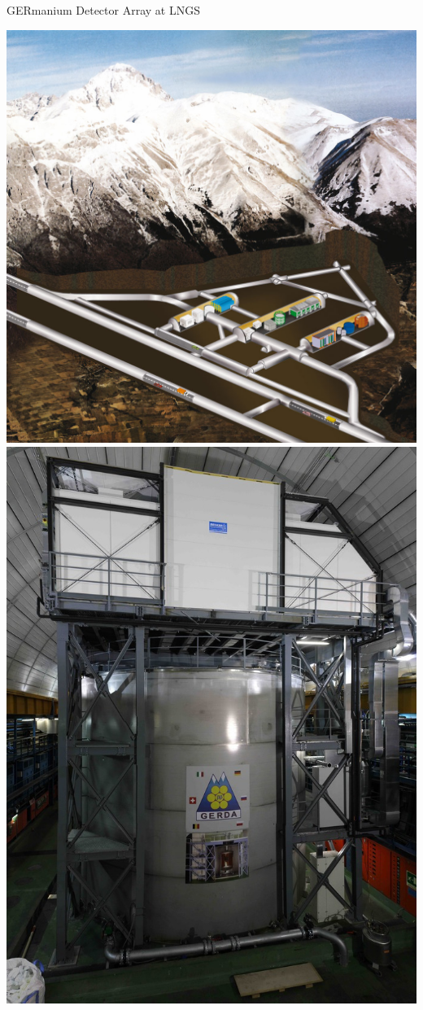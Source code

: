\documentclass[10pt,aspectratio=169]{beamer}
\begin{document}
\begin{frame}[plain]{\alert{GER}manium \alert{D}etector \alert{A}rray at LNGS}
  \begin{center}
    \includegraphics[height=0.95\textheight]{setup/lngs-map.jpg}
    \hspace{0.2cm}
    \includegraphics[height=0.95\textheight]{setup/gerda-lngs.jpg}
  \end{center}
\end{frame}
\end{document}
